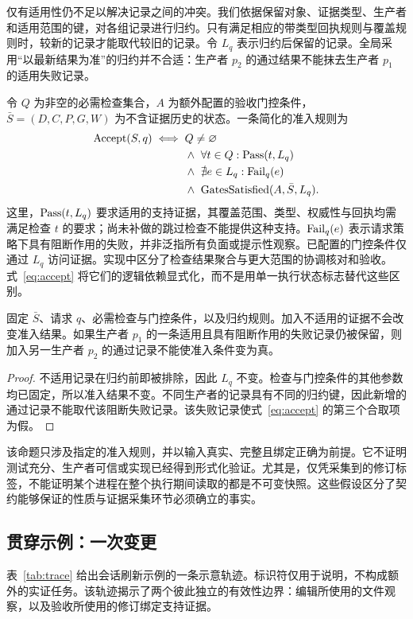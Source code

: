 仅有适用性仍不足以解决记录之间的冲突。我们依据保留对象、证据类型、生产者和适用范围的键，对各组记录进行归约。只有满足相应的带类型回执规则与覆盖规则时，较新的记录才能取代较旧的记录。令 $L_q$ 表示归约后保留的记录。全局采用“以最新结果为准”的归约并不合适：生产者 $p_2$ 的通过结果不能抹去生产者 $p_1$ 的适用失败记录。

令 $Q$ 为非空的必需检查集合，$A$ 为额外配置的验收门控条件，$\bar S=(D,C,P,G,W)$ 为不含证据历史的状态。一条简化的准入规则为
\begin{align}
 \operatorname{Accept}(S,q) \iff{}& Q\ne\varnothing \nonumber\\
 &\land\ \forall t\in Q:\operatorname{Pass}(t,L_q) \nonumber\\
 &\land\ \nexists e\in L_q:\operatorname{Fail}_q(e) \nonumber\\
 &\land\ \operatorname{GatesSatisfied}(A,\bar S,L_q).
 \label{eq:accept}
\end{align}
这里，$\operatorname{Pass}(t,L_q)$ 要求适用的支持证据，其覆盖范围、类型、权威性与回执均需满足检查 $t$ 的要求；尚未补做的跳过检查不能提供这种支持。$\operatorname{Fail}_q(e)$ 表示请求策略下具有阻断作用的失败，并非泛指所有负面或提示性观察。已配置的门控条件仅通过 $L_q$ 访问证据。实现中区分了检查结果聚合与更大范围的协调核对和验收。式~\eqref{eq:accept} 将它们的逻辑依赖显式化，而不是用单一执行状态标志替代这些区别。

\begin{proposition}[加入无关记录时的保持性]
\label{prop:preservation}
固定 $\bar S$、请求 $q$、必需检查与门控条件，以及归约规则。加入不适用的证据不会改变准入结果。如果生产者 $p_1$ 的一条适用且具有阻断作用的失败记录仍被保留，则加入另一生产者 $p_2$ 的通过记录不能使准入条件变为真。
\end{proposition}
\begin{proof}
不适用记录在归约前即被排除，因此 $L_q$ 不变。检查与门控条件的其他参数均已固定，所以准入结果不变。不同生产者的记录具有不同的归约键，因此新增的通过记录不能取代该阻断失败记录。该失败记录使式~\eqref{eq:accept} 的第三个合取项为假。
\end{proof}

该命题只涉及指定的准入规则，并以输入真实、完整且绑定正确为前提。它不证明测试充分、生产者可信或实现已经得到形式化验证。尤其是，仅凭采集到的修订标签，不能证明某个进程在整个执行期间读取的都是不可变快照。这些假设区分了契约能够保证的性质与证据采集环节必须确立的事实。

\subsection{贯穿示例：一次变更}
表~\ref{tab:trace} 给出会话刷新示例的一条示意轨迹。标识符仅用于说明，不构成额外的实证任务。该轨迹揭示了两个彼此独立的有效性边界：编辑所使用的文件观察，以及验收所使用的修订绑定支持证据。


